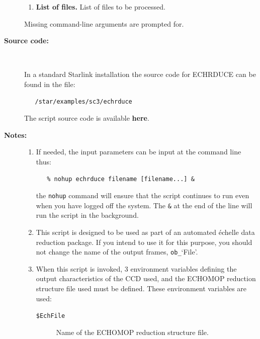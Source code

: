 \documentclass[twoside,11pt]{article}
\newcommand{\htmlref}[2]{#1}
\begin{document}
\begin{description}
\begin{enumerate}
\item {\bf List of files.}
      List of files to be processed.

\end{enumerate}

     Missing command-line arguments are prompted for.

\item [{\bf Source code:}] \mbox{} \\
\begin{latex}
In a standard Starlink installation the source code for ECHRDUCE can be found
in the file:
\begin{verbatim}
   /star/examples/sc3/echrduce
\end{verbatim}
\end{latex}
\begin{htmlonly}
      The script source code is available
      \htmlref{{\bf here}}{se_echrduce_source}.
\end{htmlonly}

\item [{\bf Notes:}] \mbox{}
\begin{enumerate}

\item If needed, the input parameters can be input at the command
      line thus:

\begin{verbatim}
   % nohup echrduce filename [filename...] &
\end{verbatim}

      the \verb+nohup+ command will ensure that the script continues
      to run even when you have logged off the system.  The \verb+&+ at
      the end of the line will run the script in the background.

\item This script is designed to be used as part of an automated
      \'{e}chelle data reduction package.  If you intend to use it
      for this purpose, you should not change the name of the output
      frames, \verb+ob_+`File'.

\item When this script is invoked, 3 environment variables defining
      the output characteristics of the CCD used, and the ECHOMOP
      reduction structure file used must be defined.
      These environment variables are used:

\begin{description}

\item [{\tt{\$EchFile}}]
      Name of the ECHOMOP reduction structure file.


\end{description}
\end{enumerate}
\end{description}
\end{document}
